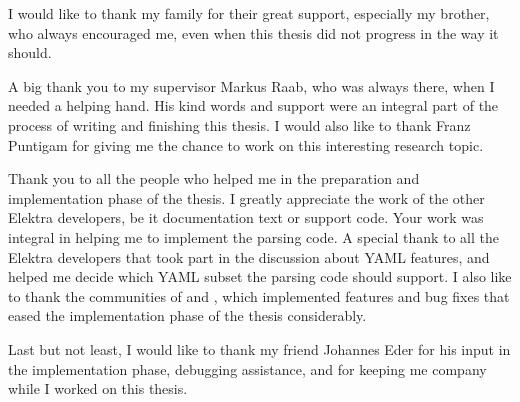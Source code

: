 \begin{acknowledgements*}
I would like to thank my family for their great support, especially my brother, who always encouraged me, even when this thesis did not progress in the way it should.

A big thank you to my supervisor Markus Raab, who was always there, when I needed a helping hand. His kind words and support were an integral part of the process of writing and finishing this thesis. I would also like to thank Franz Puntigam for giving me the chance to work on this interesting research topic.

Thank you to all the people who helped me in the preparation and implementation phase of the thesis. I greatly appreciate the work of the other Elektra developers, be it documentation text or support code. Your work was integral in helping me to implement the parsing code. A special thank to all the Elektra developers that took part in the discussion about YAML features, and helped me decide which YAML subset the parsing code should support. I also like to thank the communities of  and , which implemented features and bug fixes that eased the implementation phase of the thesis considerably.

Last but not least, I would like to thank my friend Johannes Eder for his input in the implementation phase, debugging assistance, and for keeping me company while I worked on this thesis.
\end{acknowledgements*}
